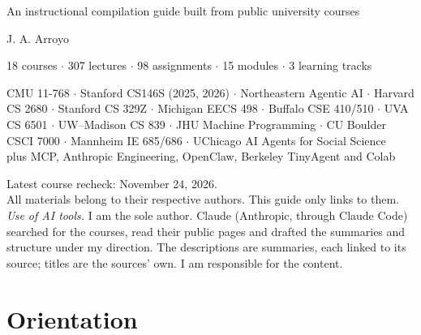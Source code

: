 \documentclass[10pt,oneside]{report}
\begin{document}
\begin{titlepage}\centering
\vspace*{3cm}{\Huge\bfseries Learning to Build Agentic Systems\par}\vspace{0.6cm}
{\Large An instructional compilation guide built from public university courses\par}\vspace{0.8cm}
{\large J. A. Arroyo\par}\vspace{0.8cm}
{\large 18 courses $\cdot$ 307 lectures $\cdot$ 98 assignments $\cdot$ 15 modules $\cdot$ 3 learning tracks\par}\vspace{1.5cm}
\begin{minipage}{0.8\linewidth}\centering\small
CMU 11-768 $\cdot$ Stanford CS146S (2025, 2026) $\cdot$ Northeastern Agentic AI $\cdot$ Harvard CS 2680 $\cdot$ Stanford CS 329Z $\cdot$ Michigan EECS 498 $\cdot$ Buffalo CSE 410/510 $\cdot$ UVA CS 6501 $\cdot$ UW--Madison CS 839 $\cdot$ JHU Machine Programming $\cdot$ CU Boulder CSCI 7000 $\cdot$ Mannheim IE 685/686 $\cdot$ UChicago AI Agents for Social Science\\[4pt]
plus MCP, Anthropic Engineering, OpenClaw, Berkeley TinyAgent and Colab
\end{minipage}\vfill
{\small Latest course recheck: November 24, 2026.\\ All materials belong to their respective authors. This guide only links to them.\\[6pt]
\emph{Use of AI tools.} I am the sole author. Claude (Anthropic, through Claude Code) searched for the courses, read their public pages and drafted the summaries and structure under my direction. The descriptions are summaries, each linked to its source; titles are the sources' own. I am responsible for the content.\par}
\end{titlepage}
\hypertarget{toc}{}\tableofcontents
\part{Orientation}
\end{document}
